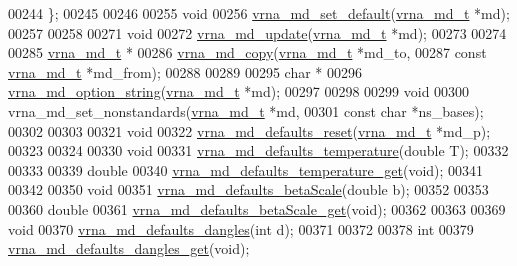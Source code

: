 \begin{DoxyCode}
00244 \};
00245 
00246 
00255 \textcolor{keywordtype}{void}
00256 \hyperlink{group__model__details_ga8ac6ff84936282436f822644bf841f66}{vrna\_md\_set\_default}(\hyperlink{group__model__details_structvrna__md__s}{vrna\_md\_t} *md);
00257 
00258 
00271 \textcolor{keywordtype}{void}
00272 \hyperlink{group__model__details_ga36ae40b8c3b82362f5798ad5b047b814}{vrna\_md\_update}(\hyperlink{group__model__details_structvrna__md__s}{vrna\_md\_t} *md);
00273 
00274 
00285 \hyperlink{group__model__details_structvrna__md__s}{vrna\_md\_t} *
00286 \hyperlink{group__model__details_ga619057a740918b5fb01808362bb67aea}{vrna\_md\_copy}(\hyperlink{group__model__details_structvrna__md__s}{vrna\_md\_t}        *md\_to,
00287              \textcolor{keyword}{const} \hyperlink{group__model__details_structvrna__md__s}{vrna\_md\_t}  *md\_from);
00288 
00289 
00295 \textcolor{keywordtype}{char} *
00296 \hyperlink{group__model__details_ga3a7469f0725a849af6ba61a57dfd60ce}{vrna\_md\_option\_string}(\hyperlink{group__model__details_structvrna__md__s}{vrna\_md\_t} *md);
00297 
00298 
00299 \textcolor{keywordtype}{void}
00300 vrna\_md\_set\_nonstandards(\hyperlink{group__model__details_structvrna__md__s}{vrna\_md\_t}  *md,
00301                          \textcolor{keyword}{const} \textcolor{keywordtype}{char} *ns\_bases);
00302 
00303 
00321 \textcolor{keywordtype}{void}
00322 \hyperlink{group__model__details_ga70834424cf804d149937de89f80ceb45}{vrna\_md\_defaults\_reset}(\hyperlink{group__model__details_structvrna__md__s}{vrna\_md\_t} *md\_p);
00323 
00324 
00330 \textcolor{keywordtype}{void}
00331 \hyperlink{group__model__details_gaf9e527e9a2f7e6fd6e42bc6e602f5445}{vrna\_md\_defaults\_temperature}(\textcolor{keywordtype}{double} T);
00332 
00333 
00339 \textcolor{keywordtype}{double}
00340 \hyperlink{group__model__details_ga96b24a74437f9ba46c4e06343155bf46}{vrna\_md\_defaults\_temperature\_get}(\textcolor{keywordtype}{void});
00341 
00342 
00350 \textcolor{keywordtype}{void}
00351 \hyperlink{group__model__details_gae984567db36c3f9b8731ecc917abf3a2}{vrna\_md\_defaults\_betaScale}(\textcolor{keywordtype}{double} b);
00352 
00353 
00360 \textcolor{keywordtype}{double}
00361 \hyperlink{group__model__details_gabb8780f5410c52f970d75b044059bd09}{vrna\_md\_defaults\_betaScale\_get}(\textcolor{keywordtype}{void});
00362 
00363 
00369 \textcolor{keywordtype}{void}
00370 \hyperlink{group__model__details_gac76a5374def8e5e4e644ff6e4cc72dee}{vrna\_md\_defaults\_dangles}(\textcolor{keywordtype}{int} d);
00371 
00372 
00378 \textcolor{keywordtype}{int}
00379 \hyperlink{group__model__details_ga67ca06f95ae133778c79a4493c9817b8}{vrna\_md\_defaults\_dangles\_get}(\textcolor{keywordtype}{void});

\end{DoxyCode}
